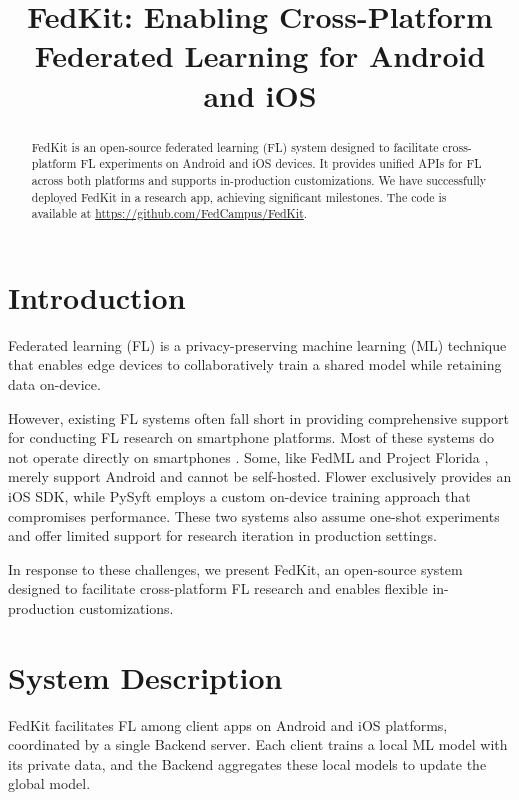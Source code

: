 \documentclass[letterpaper]{article} %
\title{FedKit: Enabling Cross-Platform Federated Learning for Android and iOS}
\author{}
\begin{document}
\maketitle

\begin{abstract}
    FedKit is an open-source federated learning (FL) system designed to
    facilitate cross-platform FL experiments on Android and iOS devices.
    It provides unified APIs for FL across both platforms and supports
    in-production customizations.
    We have successfully deployed FedKit in a research app,
    achieving significant milestones.
    The code is available at \url{https://github.com/FedCampus/FedKit}.
\end{abstract}

\section{Introduction}

Federated learning (FL) \cite{mcmahan2017communication}
is a privacy-preserving machine learning (ML) technique
that enables edge devices to collaboratively train a shared model while
retaining data on-device.

However, existing FL systems often fall short in
providing comprehensive support for conducting FL research on
smartphone platforms.
Most of these systems do not operate directly on smartphones
\cite[e.g.,][]{bonawitz2019towards,liu2021fate,ma2019paddlepaddle,openfl_citation}.
Some, like FedML \cite{he2020fedml} and
Project Florida \cite{madrigal2023project},
merely support Android and cannot be self-hosted.
Flower \cite{beutel2020flower,mathur2021ondevice} exclusively provides
an iOS SDK,
while PySyft \cite{ryffel2018generic,Ziller2021,hall2021syft} employs
a custom on-device training approach that compromises performance.
These two systems also assume one-shot experiments and
offer limited support for research iteration in production settings.

In response to these challenges, we present FedKit,
an open-source system designed to facilitate cross-platform FL research and
enables flexible in-production customizations.

\section{System Description}

FedKit facilitates FL among client apps on Android and iOS platforms,
coordinated by a single Backend server.
Each client trains a local ML model with its private data,
and the Backend aggregates these local models to update the global model.
\end{document}
